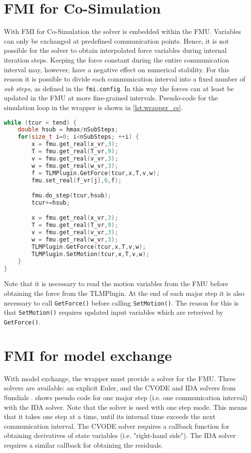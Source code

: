 \documentclass[11pt,a4paper]{report}
\begin{document}
\section{FMI for Co-Simulation}
\label{sec:fmi_cs}
With FMI for Co-Simulation the solver is embedded within the FMU.
Variables can only be exchanged at predefined communication points.
Hence, it is not possible for the solver to obtain interpolated force variables during internal iteration steps.
Keeping the force constant during the entire communication interval may, however, have a negative effect on numerical stability.
For this reason it is possible to divide each communication interval into a fixed number of \textit{sub steps}, as defined in the \texttt{fmi.config}.
In this way the forces can at least be updated in the FMU at more fine-grained intervals.
Pseudo-code for the simulation loop in the wrapper is shown in \cref{lst:wrapper_cs}.

\begin{lstlisting}[float, language=c++, basicstyle=\ttfamily\small,floatplacement=htb,caption=Blabla,label=lst:wrapper_cs]
while (tcur < tend) {
    double hsub = hmax/nSubSteps;
    for(size_t i=0; i<nSubSteps; ++i) {
        x = fmu.get_real(x_vr,3);
        T = fmu.get_real(T_vr,9);
        v = fmu.get_real(v_vr,3);
        w = fmu.get_real(w_vr,3);
        f = TLMPlugin.GetForce(tcur,x,T,v,w);
        fmu.set_real(f_vr[j],6,f);

        fmu.do_step(tcur,hsub);
        tcur+=hsub;

        x = fmu.get_real(x_vr,3);
        T = fmu.get_real(T_vr,9);
        v = fmu.get_real(v_vr,3);
        w = fmu.get_real(w_vr,3);
        TLMPlugin.GetForce(tcur,x,T,v,w);
        TLMPlugin.SetMotion(tcur,x,T,v,w);
    }
}
\end{lstlisting}

Note that it is necessary to read the motion variables from the FMU before obtaining the force from the TLMPlugin. 
At the end of each major step it is also necessary to call \texttt{GetForce()} before calling \texttt{SetMotion()}.
The reason for this is that \texttt{SetMotion()} requires updated input variables which are retreived by \texttt{GetForce()}.

\section{FMI for model exchange}
With model exchange, the wrapper must provide a solver for the FMU.
Three solvers are available: an explicit Euler, and the CVODE and IDA solvers from Sundials \cite{hindmarsh2005}.
 shows pseudo code for one major step (i.e. one communication interval) with the IDA solver.
Note that the solver is used with one step mode.
This means that it takes one step at a time, until its internal time exceeds the next communication interval.
The CVODE solver requires a callback function for obtaining derivatives of state variables (i.e. "right-hand side").
The IDA solver requires a similar callback for obtaining the residuals.
\end{document}
